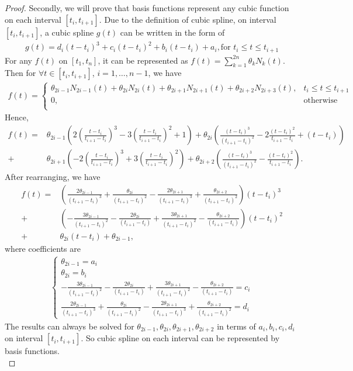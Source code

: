 \begin{proof}
Secondly, we will prove that basis functions represent any cubic function on each interval $[t_i, t_{i+1}]$. Due to the definition of cubic spline, on interval $[t_i, t_{i+1}]$, a cubic spline $g(t)$ can be written in the form of
\begin{eqnarray}
g(t)=d_i (t-t_i)^3+c_i(t-t_i)^2+b_i(t-t_i)+a_i, \mbox{for $t_i \leq t \leq t_{i+1}$}
\end{eqnarray}
For any $f(t)$ on $[t_1, t_n]$, it can be represented as $f(t)=\sum_{k=1}^{2n} \theta_k N_k(t)$. Then for $\forall t \in [t_i,t_{i+1}]$, $i=1,\ldots,n-1$, we have
\begin{align*}
f(t)=\begin{cases}
\theta_{2i-1}N_{2i-1}(t)+\theta_{2i}N_{2i}(t)+\theta_{2i+1}N_{2i+1}(t)+\theta_{2i+2}N_{2i+3}(t), & t_i \leq t \leq t_{i+1}  \\
0, & \mbox{otherwise}\\
\end{cases}
\end{align*}
Hence, 
\begin{align*}
f(t)=&\theta_{2i-1}\left( 2\left(\frac{t-t_{i}}{t_{i+1}-t_{i}}\right)^3-3\left(\frac{t-t_{i}}{t_{i+1}-t_{i}}\right)^2+1  \right) +\theta_{2i} \left( \frac{(t-t_{i})^3}{(t_{i+1}-t_{i})^2}-2\frac{(t-t_{i})^2}{t_{i+1}-t_{i}}+(t-t_{i}) \right) \\
+&\theta_{2i+1} \left( -2\left(\frac{t-t_i}{t_{i+1}-t_i}\right)^3+3\left(\frac{t-t_i}{t_{i+1}-t_i}\right)^2 \right)  +\theta_{2i+2} \left( \frac{(t-t_i)^3}{(t_{i+1}-t_i)^2}-\frac{(t-t_i)^2}{t_{i+1}-t_i} \right).
\end{align*}
After rearranging, we have
\begin{align*}
f(t)=& \left(\frac{2\theta_{2i-1}}{(t_{i+1}-t_{i})^3} +\frac{\theta_{2i}}{(t_{i+1}-t_{i})^2} -\frac{2\theta_{2i+1}}{(t_{i+1}-t_{i})^3} +\frac{\theta_{2i+2}}{(t_{i+1}-t_{i})^2} \right)  (t-t_i)^3 \\
+& \left(-\frac{3\theta_{2i-1}}{(t_{i+1}-t_{i})^2} -\frac{2\theta_{2i}}{(t_{i+1}-t_{i})} +\frac{3\theta_{2i+1}}{(t_{i+1}-t_{i})^2} - \frac{\theta_{2i+2}}{(t_{i+1}-t_{i})}\right)  (t-t_i)^2 \\
+&  \theta_{2i} (t-t_i) +\theta_{2i-1},
\end{align*}
where coefficients are
\begin{align*}
\begin{cases}
\theta_{2i-1}=a_i\\
\theta_{2i}=b_i\\
-\frac{3\theta_{2i-1}}{(t_{i+1}-t_{i})^2} -\frac{2\theta_{2i}}{(t_{i+1}-t_{i})} +\frac{3\theta_{2i+1}}{(t_{i+1}-t_{i})^2} - \frac{\theta_{2i+2}}{(t_{i+1}-t_{i})}=c_i\\
\frac{2\theta_{2i-1}}{(t_{i+1}-t_{i})^3} +\frac{\theta_{2i}}{(t_{i+1}-t_{i})^2} -\frac{2\theta_{2i+1}}{(t_{i+1}-t_{i})^3} +\frac{\theta_{2i+2}}{(t_{i+1}-t_{i})^2}=d_i
\end{cases}
\end{align*}
The results can always be solved for $\theta_{2i-1}, \theta_{2i},\theta_{2i+1},\theta_{2i+2}$ in terms of $a_i,b_i,c_i,d_i$ on interval $[t_i, t_{i+1}]$. So cubic spline on each interval can be represented by basis functions. \\


\end{proof}
